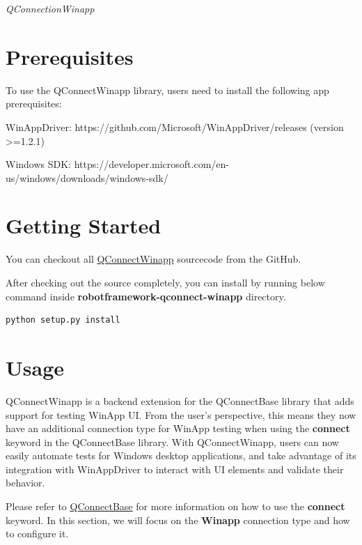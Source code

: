 %
%

\emph{QConnectionWinapp}

\hypertarget{prerequisites}{%
\section{Prerequisites}\label{prerequisites}}
To use the QConnectWinapp library, users need to install the following app prerequisites:

WinAppDriver: https://github.com/Microsoft/WinAppDriver/releases (version \textgreater{}=1.2.1)

Windows SDK: https://developer.microsoft.com/en-us/windows/downloads/windows-sdk/

\hypertarget{getting-started}{%
\section{Getting Started}\label{getting-started}}

You can checkout all
\href{https://github.com/test-fullautomation/robotframework-qconnect-winapp/}{QConnectWinapp}
sourcecode from the GitHub.

After checking out the source completely, you can install by running
below command inside \textbf{robotframework-qconnect-winapp} directory.

\begin{verbatim}
python setup.py install
\end{verbatim}

\hypertarget{usage}{%
\section{Usage}\label{usage}}

QConnectWinapp is a backend extension for the QConnectBase library that adds support for testing WinApp UI.
From the user's perspective, this means they now have an additional connection type for WinApp testing when using the \textbf{connect} keyword in the QConnectBase library.
With QConnectWinapp, users can now easily automate tests for Windows desktop applications, and take advantage of its integration with WinAppDriver to interact with UI elements and validate their behavior.

Please refer to \href{https://github.com/test-fullautomation/robotframework-qconnect-base/blob/develop/QConnectBase/QConnectBase.pdf}{QConnectBase} for more information on how to use the \textbf{connect} keyword.
In this section, we will focus on the \textbf{Winapp} connection type and how to configure it.

